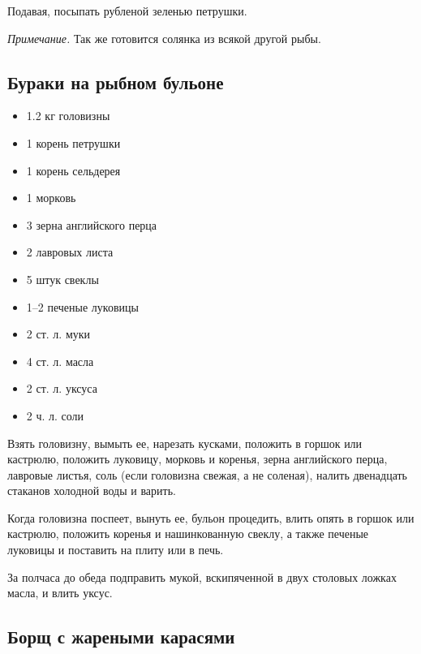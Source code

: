 Подавая, посыпать рубленой зеленью петрушки.

\emph{Примечание.} Так же готовится солянка из всякой другой рыбы.

\subsection{Бураки на рыбном бульоне}\label{12buraki-ryb}

\begin{itemize}
	\item 1.2 кг головизны 
    \item 1 корень петрушки 
    \item 1 корень сельдерея
    \item 1 морковь
    \item 3 зерна английского перца 
    \item 2 лавровых листа 
    \item 5 штук свеклы
    \item 1–2 печеные луковицы
    \item 2 ст. л. муки 
    \item 4 ст. л. масла
    \item 2 ст. л. уксуса
    \item 2 ч. л. соли
\end{itemize}

Взять головизну, вымыть ее, нарезать кусками, положить в горшок или кастрюлю, положить луковицу, морковь и коренья, зерна английского перца, лавровые листья, соль (если головизна свежая, а не соленая), налить двенадцать стаканов холодной воды и варить.

Когда головизна поспеет, вынуть ее, бульон процедить, влить опять в горшок или кастрюлю, положить коренья и нашинкованную свеклу, а также печеные луковицы и поставить на плиту или в печь.

За полчаса до обеда подправить мукой, вскипяченной в двух столовых ложках масла, и влить уксус.

\subsection{Борщ с жареными карасями}\label{13borsch-karas}

